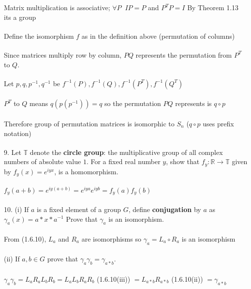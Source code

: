\documentclass{article}
\begin{document}
\begin{siderules}
\null\qquad Matrix multiplication is associative; \(\forall P\;\; IP=P\) and \(P^{T}P=I\) By \color{gray}Theorem 1.13 \color{black} its a group\\\\
\null\qquad Define the isomorphism \(f\) as in the definition above (permutation of columns)\\\\
\null\qquad Since matrices multiply row by column, \(PQ\) represents the permutation from \(P^{T}\) to \(Q\).\\\\
\null\qquad Let \(p,q,p^{-1},q^{-1}\) be \(f^{-1}(P),f^{-1}(Q),f^{-1}(P^{T}),f^{-1}(Q^{T})\)\\\\
\null\qquad \(P^{T}\) to \(Q\) means \(q(p(p^{-1}))=q\) so the permutation \(PQ\) represents is \(q\circ p\)\\\\
\null\qquad Therefore group of permutation matrices is isomorphic to \(S_{n}\) (\(q\circ p\) uses prefix notation)\\\\
\color{blue} 9. Let \(\mathbb{T}\) denote the \textbf{circle group}: the multiplicative group of all complex numbers of absolute value \(1\). 
For a fixed real number \(y\), show that \(f_{y}:\mathbb{R}\to\mathbb{T}\) given by \(f_{y}(x)=e^{iyx}\), is a homomorphism.\color{black}\\\\
\null\qquad \(f_{y}(a+b)=e^{iy(a+b)}=e^{iya}e^{iyb}=f_{y}(a)f_{y}(b)\)\\\\
\color{blue} 10. (i) If \(a\) is a fixed element of a group \(G\), define \textbf{conjugation} by \(a\) as \(\gamma_{a}(x)=a*x*a^{-1}\)
Prove that \(\gamma_{a}\) is an isomorphism.\\\\\color{black}
\null\qquad From \color{gray}(1.6.10)\color{black}, \(L_{a}\) and \(R_{a}\) are isomorphisms so \(\gamma_{a}=L_{a}\circ R_{a}\) is an isomorphism\\\\
\color{blue} (ii) If \(a,b\in G\) prove that \(\gamma_{a}\gamma_{b}=\gamma_{a*b}\).\\\\\color{black}
\null\qquad \(\gamma_{a}\gamma_{b}=L_{a}R_{a}L_{b}R_{b}=L_{a}L_{b}R_{a}R_{b}\) \color{gray}(1.6.10(iii)) \color{black}\(=L_{a*b}R_{a*b}\) \color{gray}(1.6.10(ii)) \color{black}\(=\gamma_{a*b}\)\\\\

\end{siderules}
\end{document}
